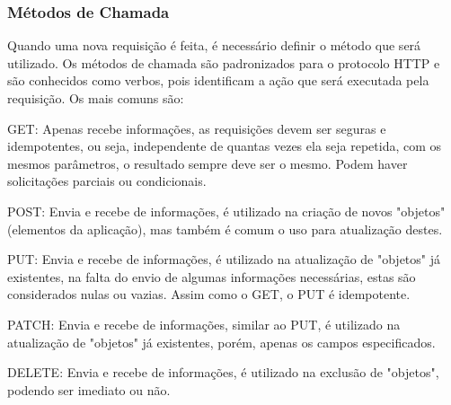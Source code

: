     	\subsubsection{Métodos de Chamada}
    	\label{sec:metodos-chamada}
    	
    	Quando uma nova requisição é feita, é necessário definir o método que será utilizado. Os métodos de chamada são padronizados para o protocolo \gls{HTTP} e são conhecidos como verbos, pois identificam a ação que será executada pela requisição. Os mais comuns são:
    	
        \begin{alineascomponto}
        	\item GET: Apenas recebe informações, as requisições devem ser seguras e idempotentes, ou seja, independente de quantas vezes ela seja repetida, com os mesmos parâmetros, o resultado sempre deve ser o mesmo. Podem haver solicitações parciais ou condicionais.

            \item POST: Envia e recebe de informações, é utilizado na criação de novos "objetos"  (elementos da aplicação), mas também é comum o uso para atualização destes.
            
            \item PUT: Envia e recebe de informações, é utilizado na atualização de "objetos" já existentes, na falta do envio de algumas informações necessárias, estas são considerados nulas ou vazias. Assim como o GET, o PUT é idempotente.
            
            \item PATCH: Envia e recebe de informações, similar ao PUT,  é utilizado na atualização de "objetos" já existentes, porém, apenas os campos especificados.

            \item DELETE: Envia e recebe de informações, é utilizado na exclusão de "objetos", podendo ser imediato ou não.
        \end{alineascomponto}
        
        \begin{table}[h!]	
        	\centering
        \end{table}

